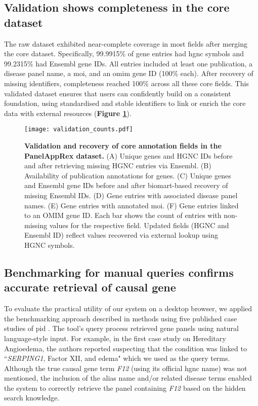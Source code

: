 \subsection{Validation shows completeness in the core dataset}
\noindent
The raw dataset exhibited near-complete coverage in most fields after merging the core dataset. 
Specifically, 99.9915\% of gene entries had \ac{hgnc} symbols %
and 99.2315\% had Ensembl gene IDs. %
All entries included at least one publication, a disease panel name, a \ac{moi}, and an \ac{omim} gene ID (100\% each). 
After recovery of missing identifiers, completeness reached 100\% across all these core fields.
This validated dataset ensures that users can confidently build on a consistent foundation, using standardised and stable identifiers to link or enrich the core data with external resources (\textbf{Figure \ref{fig:validation}}).

\begin{figure}[ht]
    \centering
    \texttt{[image: validation\_counts.pdf]}
\caption{\textbf{Validation and recovery of core annotation fields in the PanelAppRex dataset.}
(A) Unique genes and HGNC IDs before and after retrieving missing HGNC entries via Ensembl.
(B) Availability of publication annotations for genes.
(C) Unique genes and Ensembl gene IDs before and after biomart-based recovery of missing Ensembl IDs.
(D) Gene entries with associated disease panel names.
(E) Gene entries with annotated \ac{moi}.
(F) Gene entries linked to an OMIM gene ID.
Each bar shows the count of entries with non-missing values for the respective field. Updated fields (HGNC and Ensembl ID) reflect values recovered via external lookup using HGNC symbols.
}
    \label{fig:validation}
\end{figure}

\subsection{Benchmarking for manual queries confirms accurate retrieval of causal gene}
\noindent
To evaluate the practical utility of our system on a desktop browser, we applied the benchmarking approach described in methods using five published case studies of \ac{pid}
\cite{arruda_genetic_2015, 
mcaleer_severe_2015,
verhoeven_hematopoietic_2022,
magerus-chatinet_autoimmune_2013,
sharfe_fatal_2014}. %
The tool's query process retrieved gene panels using natural language-style input. 
For example, in the first case study on Hereditary Angioedema, the authors reported suspecting that the condition was linked to ``\textit{SERPING1}, Factor XII, and edema" which we used as the query terms. 
Although the true causal gene term \textit{F12} (using its official \ac{hgnc} name) was not mentioned, the inclusion of the alias name and/or related disease terms enabled the system to correctly retrieve the panel containing \textit{F12} based on the hidden search knowledge.

